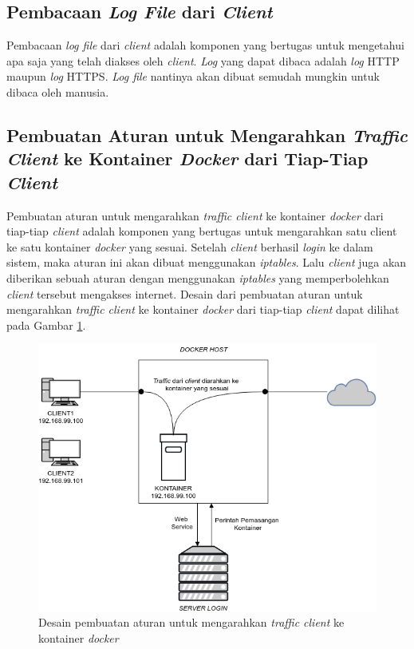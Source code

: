 	\subsection{Pembacaan \textit{Log File} dari \textit{Client}}
	Pembacaan \textit{log file} dari \textit{client} adalah komponen yang bertugas untuk mengetahui apa saja yang telah diakses oleh \textit{client}. \textit{Log} yang dapat dibaca adalah \textit{log} HTTP maupun \textit{log} HTTPS. \textit{Log file} nantinya akan dibuat semudah mungkin untuk dibaca oleh manusia.

   	\subsection{Pembuatan Aturan untuk Mengarahkan \textit{Traffic Client} ke Kontainer \textit{Docker} dari Tiap-Tiap \textit{Client}}
   	Pembuatan aturan untuk mengarahkan \textit{traffic client} ke kontainer \textit{docker} dari tiap-tiap \textit{client} adalah komponen yang bertugas untuk mengarahkan satu client ke satu kontainer \textit{docker} yang sesuai. Setelah \textit{client} berhasil \textit{login} ke dalam sistem, maka aturan ini akan dibuat menggunakan \textit{iptables}. Lalu \textit{client} juga akan diberikan sebuah aturan dengan menggunakan \textit{iptables} yang memperbolehkan \textit{client} tersebut mengakses internet. Desain dari pembuatan aturan untuk mengarahkan \textit{traffic client} ke kontainer \textit{docker} dari tiap-tiap \textit{client} dapat dilihat pada Gambar \ref{mengarahkankontainerdocker}.
   	
	\begin{figure}[H]
		\centering
		\includegraphics[width=\linewidth]{images/bab3/DIAGRAM3}
		\caption{Desain pembuatan aturan untuk mengarahkan \textit{traffic client} ke kontainer \textit{docker}}
		\label{mengarahkankontainerdocker}
	\end{figure}
	

	